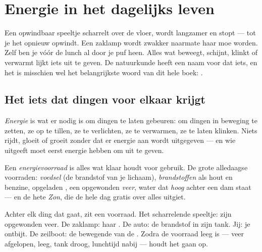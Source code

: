 \chapter{Energie in het dagelijks leven}\label{ch:g5:everyday-energy}

Een opwindbaar speeltje scharrelt over de vloer, wordt langzamer en
stopt --- tot je het opnieuw opwindt. Een zaklamp wordt zwakker
naarmate haar  moe worden. Zelf ben je vóór de lunch al door
je puf heen. Alles wat beweegt, schijnt, klinkt of verwarmt lijkt iets
uit te geven. De natuurkunde heeft een naam voor dat iets, en het is
misschien wel het belangrijkste woord van dit hele boek:
.

\section{Het iets dat dingen voor elkaar krijgt}

\begin{definition}[Energie]\label{def:g5:everyday-energy:energy}
\emph{Energie} is wat er nodig is om dingen te laten
gebeuren: om dingen in beweging te zetten, ze op te tillen, ze te
verlichten, ze te verwarmen, ze te laten klinken. Niets rijdt,
gloeit of groeit zonder dat er energie aan wordt uitgegeven --- en wie
uitgeeft moet eerst energie hebben om uit te geven.
\end{definition}

\begin{definition}[Energievoorraden]\label{def:g5:everyday-energy:store}
Een \emph{energievoorraad} is alles wat
 klaar houdt voor gebruik. De grote alledaagse voorraden:
\emph{voedsel} (de brandstof van je lichaam), \emph{brandstoffen} als
hout en benzine, opgeladen \emph{}, een opgewonden
\emph{veer}, water dat \emph{hoog} achter een dam staat --- en de hete
\emph{Zon}, die de hele dag gratis  over alles uitgiet.
\end{definition}

\begin{example}\label{ex:g5:everyday-energy:spot}
Achter elk ding dat gaat, zit een voorraad. Het scharrelende speeltje:
zijn opgewonden veer. De zaklamp: haar . De auto: de
brandstof in zijn tank. Jij: je ontbijt. De zeilboot: de bewegende
 van de . Zodra de voorraad leeg is --- veer afgelopen,
 leeg, tank droog, lunchtijd nabij --- houdt het gaan op.
\end{example}


